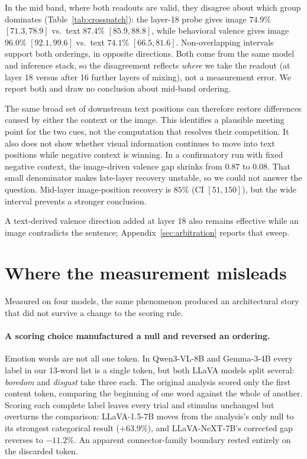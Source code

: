 \documentclass{article}
\newif\ifshort
\newcommand{\gemma}{Gemma-3-4B}
\newcommand{\qwen}{Qwen3-VL-8B}
\newcommand{\llava}{LLaVA-1.5-7B}
\newcommand{\llavanext}{LLaVA-NeXT-7B}
\begin{document}
In the mid band, where both readouts are valid, they disagree about which group dominates (Table~\ref{tab:crosspatch}): the layer-18 probe gives image $74.9\%$ $[71.3, 78.9]$ vs.\ text $87.4\%$ $[85.9, 88.8]$, while behavioral valence gives image $96.0\%$ $[92.1, 99.6]$ vs.\ text $74.1\%$ $[66.5, 81.6]$. Non-overlapping intervals support both orderings, in opposite directions. Both come from the same model and inference stack, so the disagreement reflects \emph{where} we take the readout (at layer 18 versus after 16 further layers of mixing), not a measurement error. We report both and draw no conclusion about mid-band ordering.

The same broad set of downstream text positions can therefore restore differences caused by either the context or the image. This identifies a plausible meeting point for the two cues, not the computation that resolves their competition. It also does not show whether visual information continues to move into text positions while negative context is winning. In a confirmatory run with fixed negative context, the image-driven valence gap shrinks from $0.87$ to $0.08$. That small denominator makes late-layer recovery unstable, so we could not answer the question. Mid-layer image-position recovery is $85\%$ (CI $[51,150]$), but the wide interval prevents a stronger conclusion.

A text-derived valence direction added at layer 18 also remains effective while an image contradicts the sentence; Appendix~\ref{sec:arbitration} reports that sweep.
\fi

\ifshort
\section{Where the measurement misleads}
\label{sec:models}

Measured on four models, the same phenomenon produced an architectural story that did not survive a change to the scoring rule.

\paragraph{A scoring choice manufactured a null and reversed an ordering.}
Emotion words are not all one token. In \qwen{} and \gemma{} every label in our 13-word list is a single token, but both LLaVA models split several: \emph{boredom} and \emph{disgust} take three each. The original analysis scored only the first content token, comparing the beginning of one word against the whole of another. Scoring each complete label leaves every trial and stimulus unchanged but overturns the comparison: \llava{} moves from the analysis's only null to its strongest categorical result ($+63.9\%$), and \llavanext{}'s corrected gap reverses to $-11.2\%$. An apparent connector-family boundary rested entirely on the discarded token.
\end{document}
